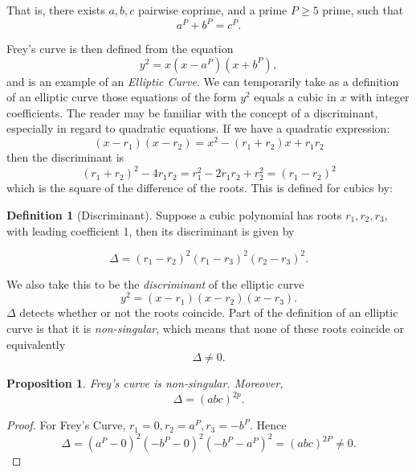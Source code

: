 \documentclass{article}
\newtheorem{prop}{Proposition}[section]
\theoremstyle{definition}
\newtheorem{definition}{Definition}[section]
\theoremstyle{definition}
\theoremstyle{definition}
\begin{document}
That is, there exists $a,b,c$ pairwise coprime, and a prime $P\geq 5$ prime, such that
$$a^P+b^P=c^P.$$ 

Frey's curve \cite{Frey} is then defined from the equation
$$y^2=x(x-a^P)(x+b^P),$$
and is an example of an \emph{Elliptic Curve}.%
\newline\newline
We can temporarily take as a definition of an elliptic curve those equations of the form $y^2$ equals a cubic in $x$ with integer coefficients.
\newline\newline
The reader may be familiar with the concept of a discriminant, especially in regard to quadratic equations. If we have a quadratic expression: $$(x-r_1)(x-r_2)=x^2-(r_1+r_2)x+r_1r_2$$ then the discriminant is $$(r_1+r_2)^2-4r_1r_2=r_1^2-2r_1r_2+r_2^2=(r_1-r_2)^2$$ which is the square of the difference of the roots. This is defined for cubics by:
\begin{definition}[Discriminant]\label{discdef}
Suppose a cubic polynomial has roots $r_1,r_2, r_3$, with leading coefficient 1, then its discriminant is given by %

$$\Delta=(r_1-r_2)^2(r_1-r_3)^2(r_2-r_3)^2.$$%
\end{definition}

   
   
   We also take this to be the \emph{discriminant} of the elliptic curve 
   $$y^2=(x-r_1)(x-r_2)(x-r_3).$$
\newline\newline
$\Delta$ detects whether or not the roots coincide. Part of the definition of an elliptic curve is that it is \emph{non-singular}, which means that none of these roots coincide or equivalently 
$$\Delta\neq0.$$
\begin{prop}
    Frey's curve is non-singular. Moreover, 
    $$\Delta=(abc)^{2p}.$$
\end{prop}
\begin{proof}
  For Frey's Curve, $r_1=0,r_2=a^P,r_3=-b^P$. Hence%
  $$\Delta=(a^P-0)^2(-b^P-0)^2(-b^P-a^P)^2=(abc)^{2P}\neq0.$$  
\end{proof}
\end{document}
